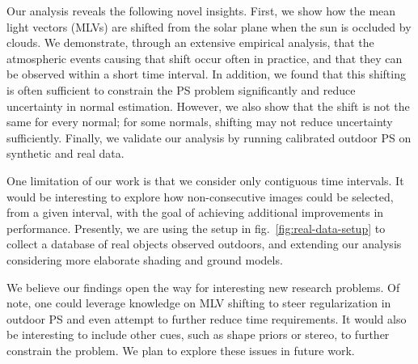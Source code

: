 Our analysis reveals the following novel insights. First, we show how the mean light vectors (MLVs) are shifted from the solar plane when the sun is occluded by clouds. We demonstrate, through an extensive empirical analysis, that the atmospheric events causing that shift occur often in practice, and that they can be observed within a short time interval. In addition, we found that this shifting is often sufficient to constrain the PS problem significantly and reduce uncertainty in normal estimation. However, we also show that the shift is not the same for every normal; for some normals, shifting may not reduce uncertainty sufficiently. Finally, we validate our analysis by running calibrated outdoor PS on synthetic and real data. 

One limitation of our work is that we consider only contiguous time intervals. It would be interesting to explore how non-consecutive images could be selected, from a given interval, with the goal of achieving additional improvements in performance. Presently, we are using the setup in fig.~\ref{fig:real-data-setup} to collect a database of real objects observed outdoors, and extending our analysis considering more elaborate shading and ground models.

We believe our findings open the way for interesting new research problems. Of note, one could leverage knowledge on MLV shifting to steer regularization in outdoor PS and even attempt to further reduce time requirements. It would also be interesting to include other cues, such as shape priors or stereo, to further constrain the problem. We plan to explore these issues in future work.





 




